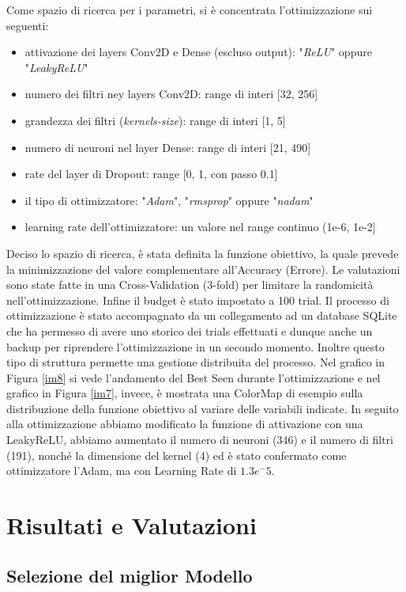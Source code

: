 Come spazio di ricerca per i parametri, si è concentrata l'ottimizzazione sui seguenti:
\begin{itemize}
    \item attivazione dei layers Conv2D e Dense (escluso output): "\textit{ReLU}" oppure "\textit{LeakyReLU}"
    \item numero dei filtri ney layers Conv2D: range di interi [32, 256]
    \item grandezza dei filtri (\textit{kernels-size}): range di interi [1, 5]
    \item numero di neuroni nel layer Dense: range di interi [21, 490]
    \item rate del layer di Dropout: range [0, 1, con passo 0.1]
    \item il tipo di ottimizzatore: "\textit{Adam}", "\textit{rmsprop}" oppure "\textit{nadam}"
    \item learning rate dell'ottimizzatore: un valore nel range continuo (1e-6, 1e-2]
\end{itemize}
Deciso lo spazio di ricerca, è stata definita la funzione obiettivo, la quale prevede la minimizzazione del valore complementare all'Accuracy (Errore). Le valutazioni sono state fatte in una Cross-Validation (3-fold) per limitare la randomicità nell'ottimizzazione.
Infine il budget è stato impostato a 100 trial. %
Il processo di ottimizzazione è stato accompagnato da un collegamento ad un database SQLite che ha permesso di avere uno storico dei trials effettuati e dunque anche un backup per riprendere l'ottimizzazione in un secondo momento. Inoltre questo tipo di struttura permette una gestione distribuita del processo.
Nel grafico in Figura \ref{im8} si vede l'andamento del Best Seen durante l'ottimizzazione e nel grafico in Figura \ref{im7}, invece, è mostrata una ColorMap di esempio sulla distribuzione della funzione obiettivo al variare delle variabili indicate.
In seguito alla ottimizzazione abbiamo modificato la funzione di attivazione con una LeakyReLU, abbiamo aumentato il numero di neuroni (346) e il numero di filtri (191), nonché la dimensione del kernel (4) ed è stato confermato come ottimizzatore l'Adam, ma con Learning Rate di $1.3e^-5$. 

\section{Risultati e Valutazioni}

\subsection{Selezione del miglior Modello}


